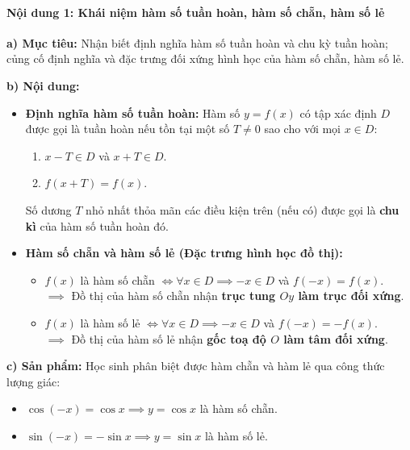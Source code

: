 \documentclass[12pt, a4paper]{article}
\begin{document}
\paragraph{Nội dung 1: Khái niệm hàm số tuần hoàn, hàm số chẵn, hàm số lẻ}
\textbf{a) Mục tiêu:} Nhận biết định nghĩa hàm số tuần hoàn và chu kỳ tuần hoàn; củng cố định nghĩa và đặc trưng đối xứng hình học của hàm số chẵn, hàm số lẻ.

\textbf{b) Nội dung:}
\begin{itemize}[leftmargin=0.6cm]
    \item \textbf{Định nghĩa hàm số tuần hoàn:} Hàm số $y = f(x)$ có tập xác định $D$ được gọi là tuần hoàn nếu tồn tại một số $T \neq 0$ sao cho với mọi $x \in D$:
    \begin{enumerate}[leftmargin=0.6cm]
        \item $x - T \in D$ và $x + T \in D$.
        \item $f(x + T) = f(x)$.
    \end{enumerate}
    Số dương $T$ nhỏ nhất thỏa mãn các điều kiện trên (nếu có) được gọi là \textbf{chu kì} của hàm số tuần hoàn đó.
    \item \textbf{Hàm số chẵn và hàm số lẻ (Đặc trưng hình học đồ thị):}
    \begin{itemize}[leftmargin=0.5cm]
        \item $f(x)$ là hàm số chẵn $\iff \forall x \in D \implies -x \in D$ và $f(-x) = f(x)$.\\
        $\implies$ Đồ thị của hàm số chẵn nhận \textbf{trục tung $Oy$ làm trục đối xứng}.
        \item $f(x)$ là hàm số lẻ $\iff \forall x \in D \implies -x \in D$ và $f(-x) = -f(x)$.\\
        $\implies$ Đồ thị của hàm số lẻ nhận \textbf{gốc toạ độ $O$ làm tâm đối xứng}.
    \end{itemize}
\end{itemize}

\textbf{c) Sản phẩm:} Học sinh phân biệt được hàm chẵn và hàm lẻ qua công thức lượng giác:
\begin{itemize}[leftmargin=0.6cm]
    \item $\cos(-x) = \cos x \implies y = \cos x$ là hàm số chẵn.
    \item $\sin(-x) = -\sin x \implies y = \sin x$ là hàm số lẻ.
\end{itemize}
\end{document}
